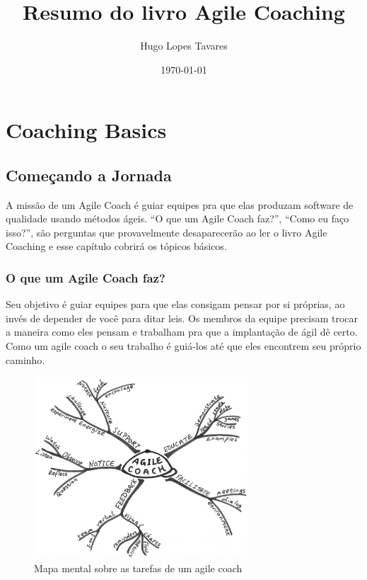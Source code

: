 \documentclass[a4paper, 10pt, font=plain]{abnt}
\begin{document}
\title{Resumo do livro Agile Coaching}
\author{Hugo Lopes Tavares}
\date{\today}

\maketitle

\part{Coaching Basics}

\chapter{Começando a Jornada}
A missão de um Agile Coach é guiar equipes pra que elas produzam software de qualidade usando métodos ágeis. ``O que um Agile Coach faz?'', ``Como eu faço isso?'', são perguntas que provavelmente desaparecerão ao ler o livro Agile Coaching e esse capítulo cobrirá os tópicos básicos.

\section{O que um Agile Coach faz?}
Seu objetivo é guiar equipes para que elas consigam pensar por si próprias, ao invés de depender de você para ditar leis. Os membros da equipe precisam trocar a maneira como eles pensam e trabalham pra que a implantação de ágil dê certo. Como um agile coach o seu trabalho é guiá-los até que eles encontrem seu próprio caminho.

  \begin{figure}[h]
    \centering
    \includegraphics[width=8cm]{mind_map_capitulo1}
    \caption{Mapa mental sobre as tarefas de um agile coach}
  \end{figure}
\end{document}
